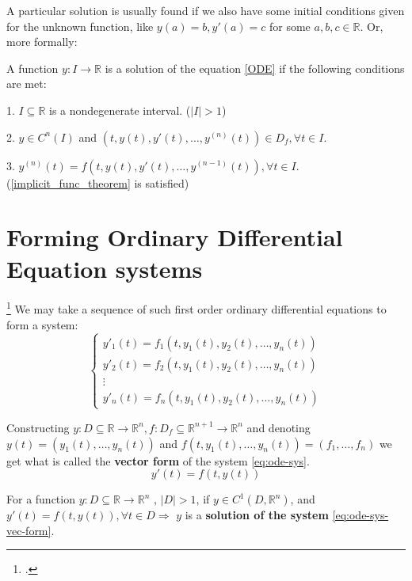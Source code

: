 A particular solution is usually found if we also have some initial conditions given for the unknown function, like $y(a)=b, y'(a)=c$ for some $a,b,c \in \mathbb{R}$.
Or, more formally:

\begin{definition}
	A function $y:I \rightarrow \mathbb{R}$ is a solution of the equation \ref{ODE} if the following conditions are met:

	1. $I \subseteq \mathbb{R}$ is a nondegenerate interval. ($|I|>1$)

	2. $y \in C^n(I)$ and $(t,y(t), y'(t), \dots, y^{(n)}(t)) \in D_f, \forall t \in I$.

	3. $y^{(n)}(t)= f(t,y(t),y'(t),\dots,y^{ (n-1) }(t)), \forall t \in I$. (\ref{implicit_func_theorem} is satisfied)

\end{definition}

\section{Forming Ordinary Differential Equation systems}\footcite{Hiroki2015}
We may take a sequence of such first order ordinary differential equations to form a system:
\begin{equation}\label{eq:ode-sys}
	\begin{cases}
		y'_1(t) = f_1(t,y_1(t),y_2(t),\dots,y_n(t)) \\
		y'_2(t) = f_2(t,y_1(t),y_2(t),\dots,y_n(t)) \\
		\vdots                                      \\
		y'_n(t) = f_n(t,y_1(t),y_2(t),\dots,y_n(t))
	\end{cases}
\end{equation}

Constructing $y: D \subseteq \mathbb{R} \rightarrow \mathbb{R}^n, f : D_f \subseteq \mathbb{R}^{n+1} \rightarrow \mathbb{R}^n$ and denoting \\
$y(t)= (y_1(t), \dots, y_n(t))$ and $f(t,y_1(t),\dots,y_n(t)) = (f_1,\dots,f_n)$ we get what is called the \textbf{vector form} of the system \ref{eq:ode-sys}.
\begin{equation}\label{eq:ode-sys-vec-form}
	y'(t) = f (t, y(t))
\end{equation}

\begin{definition}
	For a function $y:D \subseteq \mathbb{R} \rightarrow \mathbb{R}^n$ , $|D| > 1$, if $y \in C^1(D,\mathbb{R}^n)$, and $y'(t) = f(t,y(t)), \forall t \in D \Rightarrow$ $y$ is a \textbf{solution of the system} \ref{eq:ode-sys-vec-form}.
\end{definition}


